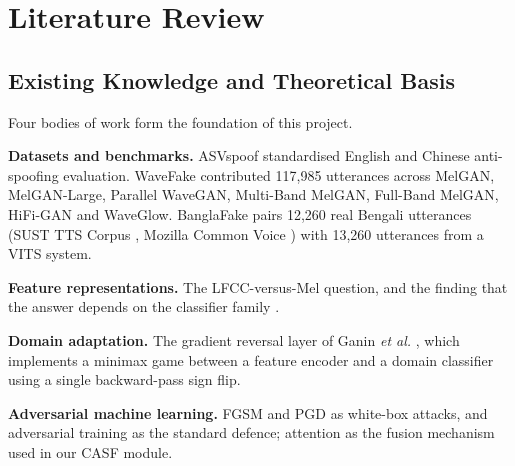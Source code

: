 \documentclass[conference]{IEEEtran}
\renewcommand{\cite}[1]{\unskip}
\begin{document}
\section{Literature Review}

\subsection{Existing Knowledge and Theoretical Basis}
Four bodies of work form the foundation of this project.

\textbf{Datasets and benchmarks.} ASVspoof \cite{todisco2019asvspoof}
standardised English and Chinese anti-spoofing evaluation. WaveFake
\cite{frank2021wavefake} contributed 117,985 utterances across MelGAN,
MelGAN-Large, Parallel WaveGAN, Multi-Band MelGAN, Full-Band MelGAN, HiFi-GAN
and WaveGlow. BanglaFake \cite{fahad2025banglafake} pairs 12,260 real Bengali
utterances (SUST TTS Corpus \cite{ahmad2021sust}, Mozilla Common Voice
\cite{ardila2020commonvoice}) with 13,260 utterances from a VITS
\cite{kim2021vits} system.

\textbf{Feature representations.} The LFCC-versus-Mel question, and the
finding that the answer depends on the classifier family
\cite{frank2021wavefake,ahmed2026melspec}.

\textbf{Domain adaptation.} The gradient reversal layer of Ganin \emph{et al.}
\cite{ganin2016dann}, which implements a minimax game between a feature
encoder and a domain classifier using a single backward-pass sign flip.

\textbf{Adversarial machine learning.} FGSM \cite{goodfellow2015fgsm} and PGD
\cite{madry2018pgd} as white-box attacks, and adversarial training as the
standard defence; attention \cite{vaswani2017attention} as the fusion
mechanism used in our CASF module.
\end{document}
